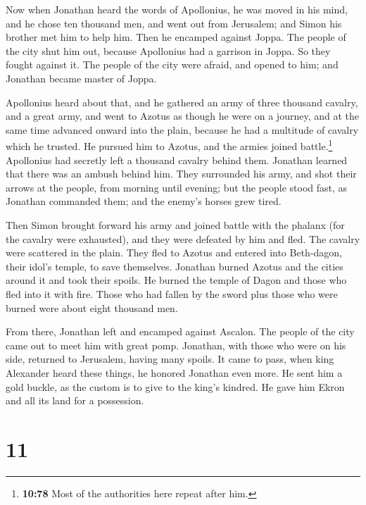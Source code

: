  Now when Jonathan heard the words of Apollonius, he was
moved in his mind, and he chose ten thousand men, and went out from
Jerusalem; and Simon his brother met him to help him. 
Then he encamped against Joppa. The people of the city shut him out,
because Apollonius had a garrison in Joppa.  So they
fought against it. The people of the city were afraid, and opened to
him; and Jonathan became master of Joppa.

 Apollonius heard about that, and he gathered an army of
three thousand cavalry, and a great army, and went to Azotus as though
he were on a journey, and at the same time advanced onward into the
plain, because he had a multitude of cavalry which he trusted.
 He pursued him to Azotus, and the armies joined
battle.\footnote{\textbf{10:78} Most of the authorities here repeat
  after him.}  Apollonius had secretly left a thousand
cavalry behind them.  Jonathan learned that there was an
ambush behind him. They surrounded his army, and shot their arrows at
the people, from morning until evening;  but the people
stood fast, as Jonathan commanded them; and the enemy's horses grew
tired.

 Then Simon brought forward his army and joined battle
with the phalanx (for the cavalry were exhausted), and they were
defeated by him and fled.  The cavalry were scattered in
the plain. They fled to Azotus and entered into Beth-dagon, their idol's
temple, to save themselves.  Jonathan burned Azotus and
the cities around it and took their spoils. He burned the temple of
Dagon and those who fled into it with fire.  Those who
had fallen by the sword plus those who were burned were about eight
thousand men.

 From there, Jonathan left and encamped against Ascalon.
The people of the city came out to meet him with great pomp.
 Jonathan, with those who were on his side, returned to
Jerusalem, having many spoils.  It came to pass, when
king Alexander heard these things, he honored Jonathan even more.
 He sent him a gold buckle, as the custom is to give to
the king's kindred. He gave him Ekron and all its land for a possession.

\hypertarget{section-10}{%
\section{11}\label{section-10}}

